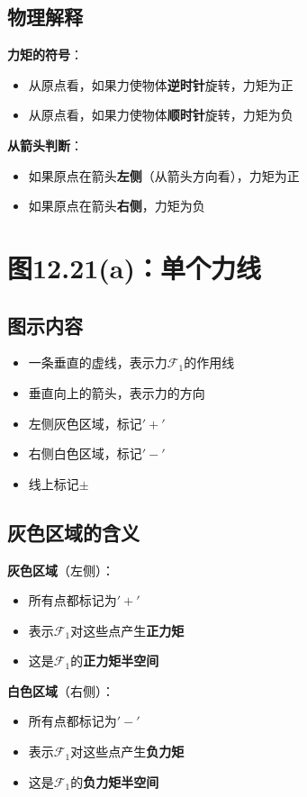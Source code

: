 \documentclass[12pt,a4paper]{article}
\begin{document}
\subsection{物理解释}

\textbf{力矩的符号}：
\begin{itemize}
\item 从原点看，如果力使物体\textbf{逆时针}旋转，力矩为正
\item 从原点看，如果力使物体\textbf{顺时针}旋转，力矩为负
\end{itemize}

\textbf{从箭头判断}：
\begin{itemize}
\item 如果原点在箭头\textbf{左侧}（从箭头方向看），力矩为正
\item 如果原点在箭头\textbf{右侧}，力矩为负
\end{itemize}

\section{图12.21(a)：单个力线}

\subsection{图示内容}

\begin{itemize}
\item 一条垂直的虚线，表示力$\mathcal{F}_1$的作用线
\item 垂直向上的箭头，表示力的方向
\item 左侧灰色区域，标记$'+'$
\item 右侧白色区域，标记$'-'$
\item 线上标记$\pm$
\end{itemize}

\subsection{灰色区域的含义}

\textbf{灰色区域}（左侧）：
\begin{itemize}
\item 所有点都标记为$'+'$
\item 表示$\mathcal{F}_1$对这些点产生\textbf{正力矩}
\item 这是$\mathcal{F}_1$的\textbf{正力矩半空间}
\end{itemize}

\textbf{白色区域}（右侧）：
\begin{itemize}
\item 所有点都标记为$'-'$
\item 表示$\mathcal{F}_1$对这些点产生\textbf{负力矩}
\item 这是$\mathcal{F}_1$的\textbf{负力矩半空间}
\end{itemize}
\end{document}
